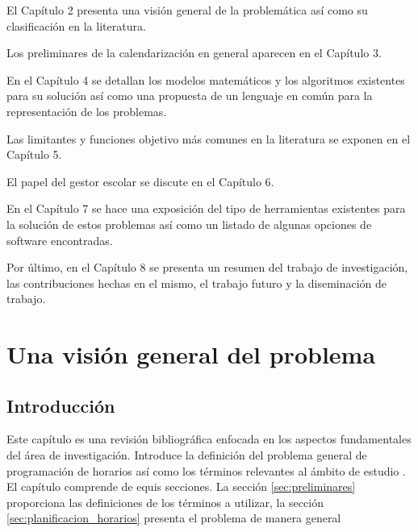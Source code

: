 \documentclass[draft,12pt,headsepline,footsepline,paper=letter]{scrreprt}
\begin{document}
El Capítulo 2 presenta una visión general de la problemática así como su clasificación en la literatura.

Los preliminares de la calendarización en general aparecen en el Capítulo 3.

En el Capítulo 4 se detallan los modelos matemáticos y los algoritmos existentes para su solución así como una propuesta de un lenguaje en común para la representación de los problemas.

Las limitantes y funciones objetivo más comunes en la literatura se exponen en el Capítulo 5.

El papel del gestor escolar se discute en el Capítulo 6.

En el Capítulo 7 se hace una exposición del tipo de herramientas existentes para la solución de estos problemas así como un listado de algunas opciones de software encontradas.

Por último, en el Capítulo 8 se presenta un resumen del trabajo de investigación, las contribuciones hechas en el mismo, el trabajo futuro y la diseminación de trabajo.

\chapter{Una visión general del problema}

\section{Introducción}

Este capítulo es una revisión bibliográfica enfocada en los aspectos fundamentales del área de investigación. Introduce la definición del problema general de programación de horarios así como los términos relevantes al ámbito de estudio \citep[p.~8]{abdullah06heuristic-approaches}.  
El capítulo comprende de equis secciones. La secci\'on \ref{sec:preliminares} proporciona las definiciones de los t\'erminos a utilizar, la secci\'on \ref{sec:planificacion_horarios} presenta el problema de manera general
\end{document}
